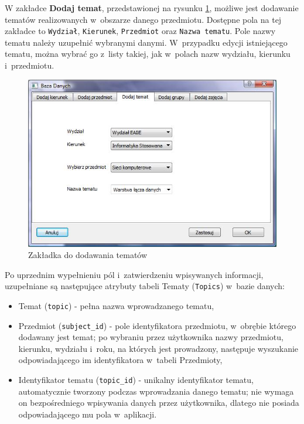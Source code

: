 W zakładce \textbf{Dodaj temat}, przedstawionej na rysunku \ref{fig:dodajTemat}, możliwe jest dodawanie tematów realizowanych w~obszarze danego przedmiotu. Dostępne pola na tej zakładce to \verb!Wydział!, \verb!Kierunek!, \verb!Przedmiot! oraz \verb!Nazwa tematu!. Pole nazwy tematu należy uzupełnić wybranymi danymi. W~przypadku edycji istniejącego tematu, można wybrać go z~listy takiej, jak w~polach nazw wydziału, kierunku i~przedmiotu.

\begin{figure}
\begin{center}
\includegraphics[scale=0.7]{dodaj_temat.jpg}
\caption{Zakładka do dodawania tematów}
\label{fig:dodajTemat}
\end{center}
\end{figure}

Po uprzednim wypełnieniu pól i~zatwierdzeniu wpisywanych informacji, uzupełniane są następujące atrybuty tabeli Tematy (\verb!Topics!) w~bazie danych:
\begin{itemize}
\item Temat (\verb!topic!) - pełna nazwa wprowadzanego tematu,
\item Przedmiot (\verb!subject_id!) - pole identyfikatora przedmiotu, w~obrębie którego dodawany jest temat; po wybraniu przez użytkownika nazwy przedmiotu, kierunku, wydziału i~roku, na których jest prowadzony, następuje wyszukanie odpowiadającego im identyfikatora w~tabeli Przedmioty,
\item Identyfikator tematu (\verb!topic_id!) - unikalny identyfikator tematu, automatycznie tworzony podczas wprowadzania danego tematu; nie wymaga on bezpośredniego wpisywania danych przez użytkownika, dlatego nie posiada odpowiadającego mu pola w~aplikacji.
\end{itemize}

